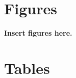 \documentclass[12pt,a4paper]{article}
\begin{document}
\clearpage





\clearpage


\section{Figures}

\textbf{Insert figures here.}

\clearpage 


\section{Tables}
\end{document}
